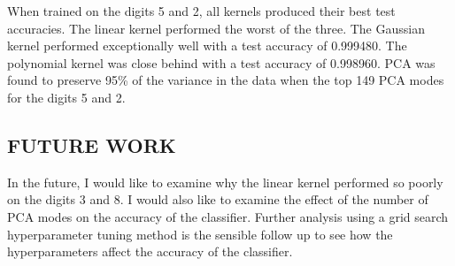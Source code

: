 \documentclass[12pt]{article}
\begin{document}
When trained on the digits 5 and 2, all kernels produced their best test accuracies. The linear kernel performed the worst
of the three. The Gaussian kernel performed exceptionally well with a test accuracy of 0.999480. The polynomial kernel
was close behind with a test accuracy of 0.998960. PCA was found to preserve 95\% of the variance in the data when the top 149 PCA modes
for the digits 5 and 2.

\subsection*{FUTURE WORK}
In the future, I would like to examine why the linear kernel performed so poorly on the digits 3 and 8. I would also like to
examine the effect of the number of PCA modes on the accuracy of the classifier. Further analysis using a grid search 
hyperparameter tuning method is the sensible follow up to see how the hyperparameters affect the accuracy of the classifier.
\end{document}
